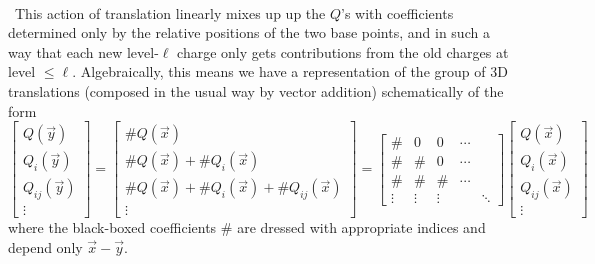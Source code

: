\documentclass[11pt,letterpaper]{article}
\begin{document}
\\
\
This action of translation linearly mixes up up the $Q$'s with coefficients determined only by the relative positions of the two base points, and in such a way that each new level-$\ell$ charge only gets contributions from the old charges at level $\leq \ell$. Algebraically, this means we have a representation of the group of 3D translations (composed in the usual way by vector addition) schematically of the form \begin{equation}
\begin{bmatrix}
Q(\vec{y}) \\
Q_i (\vec{y}) \\
Q_{ij} (\vec{y}) \\
\vdots
\end{bmatrix} = \begin{bmatrix}
\# Q(\vec{x}) \\
\# Q(\vec{x}) + \# Q_i(\vec{x}) \\
\# Q(\vec{x}) + \# Q_i(\vec{x}) + \# Q_{ij}(\vec{x}) \\
\vdots
\end{bmatrix} = \begin{bmatrix}
\# & 0 & 0 & \cdots \\
\# & \# & 0 & \cdots \\
\# & \# & \# & \cdots \\
\vdots & \vdots & \vdots & & \ddots
\end{bmatrix} \begin{bmatrix}
Q(\vec{x}) \\
Q_i (\vec{x}) \\
Q_{ij} (\vec{x}) \\
\vdots
\end{bmatrix}
\end{equation}
where the black-boxed coefficients $\#$  are dressed with appropriate indices and depend only $\vec{x} - \vec{y}$. 
\end{document}
